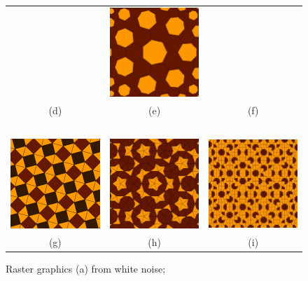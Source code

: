 \documentclass[rmp,amssymb,showpacs,showkeys,12pt,preprint]{revtex4}
\begin{document}
\begin{figure}
\begin{center}
\begin{tabular}{ccc}
&
 \includegraphics[width=5.00cm]{2008-ae-tess2}
\\
(d)&(e)&(f)\\
$\;$\\
 \includegraphics[width=5.00cm]{2008-ae-tess3}
&
 \includegraphics[width=5.00cm]{2008-ae-penrose}
&
 \includegraphics[width=5.00cm]{2008-ae-ammann}
\\
(g)&(h)&(i)\\
\end{tabular}
\end{center}
   \caption{Raster graphics
(a) from white noise;
}
\end{figure}
\end{document}
